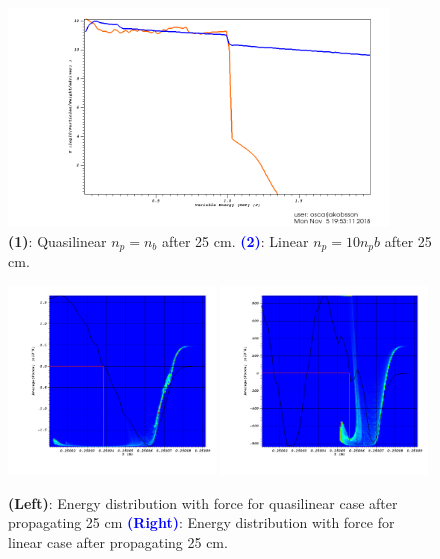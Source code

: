 \documentclass[%
onecolumn, notitlepage,
 amsmath,amssymb,
 aps,
]{article}
\begin{document}
\begin{figure}[!ht]
\includegraphics[width=0.9\textwidth]{visit0038.png}
\caption{\textcolor{Orange2}{\textbf{(1)}}{: Quasilinear $n_p=n_b$ after 25 cm.} \textcolor{blue}{\textbf{(2)}}{: Linear $n_p=10n_pb$ after 25 cm.}}
\end{figure}
\begin{figure}[!ht]
\centering
\includegraphics[width=0.49\textwidth]{visit0040.png}
\includegraphics[width=0.49\textwidth]{visit0042.png}
\caption{\textcolor{Orange2}{\textbf{(Left)}}{: Energy distribution with force for quasilinear case after propagating 25 cm} \textcolor{blue}{\textbf{(Right)}}{: Energy distribution with force for linear case after propagating 25 cm}.}
\end{figure}
\clearpage
\end{document}
